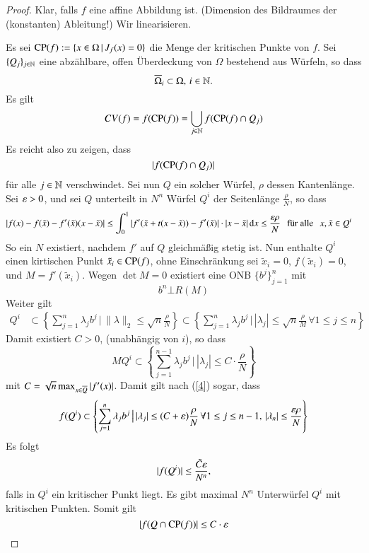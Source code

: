 \begin{proof}
    Klar, falls $f$ eine affine Abbildung ist. (Dimension des Bildraumes der (konstanten) Ableitung!)
    Wir linearisieren. 

    \noindent Es sei $\mathrm{CP}(f):=\{x\in \Omega\,|\, J_f(x)=0\}$ die Menge der kritischen Punkte von $f$.
    Sei $\{ Q_j \}_{j\in \mathbb{N}}$ eine abzählbare, offen Überdeckung von $\Omega$ bestehend aus Würfeln,
    so dass
    \[
        \overline \Omega_i\subset \Omega, \, i\in \mathbb{N}.
    \]
    Es gilt 
    \[
        CV(f)=f(\mathrm{CP}(f))=\bigcup_{j\in \mathbb{N}} f(\mathrm{CP}(f)\cap Q_j)
    \]
    Es reicht also zu zeigen, dass
    \[
    |f(\mathrm{CP}(f)\cap Q_j)|
    \]
    für alle $j\in \mathbb{N}$ verschwindet. Sei nun $Q$ ein solcher Würfel, $\rho$ dessen Kantenlänge.
    Sei $\varepsilon >0$, und sei $Q$ unterteilt in $N^n$ Würfel $Q^i$ der Seitenlänge $\frac{\rho}{N}$, so
    dass
    \begin{align}\label{4}
        |f(x)-f(\tilde x)-f'(\tilde x)(x-\tilde x)|&\leq \int_0^1|f'(\tilde x+t(x-\tilde x))-
        f'(\tilde x)|\cdot|x-\tilde x|\, \mathrm{d} x\leq \frac{\varepsilon\rho}{N} \hspace{.25cm} \text{für alle} 
            \hspace{.25cm} x,\tilde x \in Q^i
    \end{align}
    So ein $N$ existiert, nachdem $f'$ auf $Q$ gleichmäßig stetig ist. Nun enthalte $Q^i$ einen
    kirtischen Punkt $\tilde x_i \in \mathrm{CP}(f)$, ohne Einschränkung sei $\tilde x_i=0$, $f(\tilde x_i)=0$,
    und $M=f'(\tilde x _i)$. Wegen $\det M =0$ existiert eine ONB $\{b^j\}_{j=1}^n$ mit
    \[
    b^n \bot R(M)
    \]
    Weiter gilt 
    \begin{align*}
        Q^i&\subset \left\{ \sum_{j=1}^n \lambda _j b^j \, \big| \, \| \lambda \|_2\leq \sqrt{n} 
            \frac{\rho}{N} \right\}\subset\left\{\sum_{j=1}^n\lambda _jb^j \, \big|
            \, |\lambda_j|\leq \sqrt{n}\frac{\rho}{M} \, \forall 1\leq j\leq n\right\}
    \end{align*}
    Damit existiert $C>0$, (unabhängig von $i$), so dass
    \[
        MQ^i\subset \left\{\sum_{j=1}^{n-1}\lambda_jb^j\, \big| \, |\lambda_j|
            \leq C\cdot \frac{\rho}{N} \right\}
    \]
    mit $C=\sqrt{n} \max_{x\in \overline Q}|f'(x)| $. Damit gilt nach (\ref{4}) sogar, dass
    \[
        f(Q^i)\subset\left\{ \sum_{j=1}^n \lambda_jb^j\, \big| \, |\lambda_j|\leq 
        (C+\varepsilon)\frac{\rho}{N} \, \forall 1\leq j\leq n-1, \, |\lambda_n|\leq \frac{\varepsilon\rho}{N}\right\}
    \]
    Es folgt
    \[
        |f(Q^i)|\leq \frac{\tilde C\varepsilon}{N^n},
    \]
    falls in $Q^i$ ein kritischer Punkt liegt. Es gibt maximal $N^n$ Unterwürfel $Q^i$ mit kritischen
    Punkten. Somit gilt
    \[
        |f(Q\cap \mathrm{CP}(f))|\leq C\cdot \varepsilon
    \]

\end{proof}


